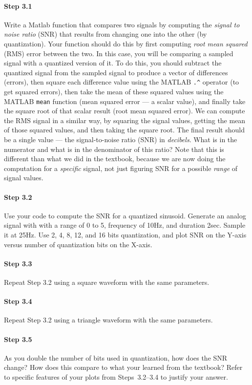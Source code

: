 \paragraph{Step 3.1} Write a Matlab function that compares two signals
by computing the \emph{signal to noise ratio} (SNR) that results from
changing one into the other (by quantization). Your function should do
this by first computing \emph{root mean squared} (RMS) error between
the two. In this case, you will be comparing a sampled signal with a
quantized version of it.  To do this, you should subtract the
quantized signal from the sampled signal to produce a vector of
differences (errors), then square each difference value using the
MATLAB \verb|.^| operator (to get squared errors), then take the mean
of these squared values using the MATLAB \verb|mean| function (mean
squared error --- a scalar value), and finally take the square root of
that scalar result (root mean squared error). We can compute the RMS
signal in a similar way, by squaring the signal values, getting the
mean of those squared values, and then taking the square root. The
final result should be a single value --- the signal-to-noise ratio
(SNR) in \emph{decibels}. What is in the numerator and what is in the
denominator of this ratio? Note that this is different than what we
did in the textbook, because we are now doing the computation for a
\emph{specific} signal, not just figuring SNR for a possible
\emph{range} of signal values.



  \paragraph{Step 3.2} Use your code to compute the SNR for a
  quantized sinusoid. Generate an analog signal with with a range of 0
  to 5, frequency of 10Hz, and duration 2sec. Sample it at 25Hz. Use
  2, 4, 8, 12, and 16 bits quantization, and plot SNR on the Y-axis
  versus number of quantization bits on the X-axis.

  \paragraph{Step 3.3} Repeat Step 3.2 using a square waveform with
  the same parameters.

  \paragraph{Step 3.4} Repeat Step 3.2 using a triangle waveform with
  the same parameters.

  \paragraph{Step 3.5} As you double the number of bits used in
  quantization, how does the SNR change? How does this compare to what
  your learned from the textbook? Refer to specific features of your
  plots from Steps~3.2--3.4 to justify your answer.



